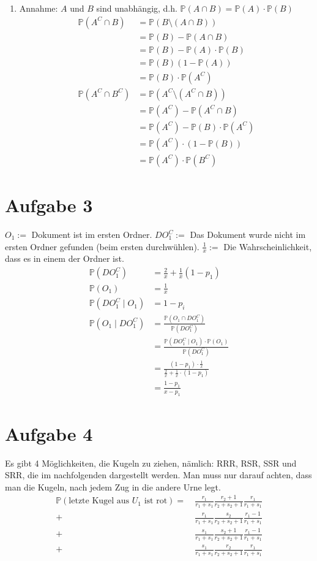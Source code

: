 \documentclass[10pt,a4paper,parskip=half]{scrartcl}
\newcommand{\PP}{\mathbb{P}}
\begin{document}
\begin{enumerate}
\begin{itemize}
		\end{itemize}
		\item 
		Annahme: $A$ und $B$ sind unabhängig, d.h. $\PP(A \cap B) = \PP(A) \cdot \PP(B)$
		\begin{align*}
			\PP(A^C \cap B) &= \PP(B \setminus (A \cap B)) \\
			&= \PP(B) - \PP(A \cap B) \\
			&= \PP(B) - \PP(A) \cdot \PP(B) \\
			&= \PP(B)(1 - \PP(A)) \\
			&= \PP(B)\cdot\PP(A^C) \\
			\PP(A^C \cap B^C) &= \PP(A^C \setminus (A^C \cap B)) \\
			&= \PP(A^C) - \PP(A^C \cap B) \\
			&= \PP(A^C) - \PP(B)\cdot\PP(A^C)  \\
			&= \PP(A^C)\cdot(1 - \PP(B)) \\
			&= \PP(A^C)\cdot\PP(B^C)
		\end{align*}
\end{enumerate}
\section*{Aufgabe 3}
$O_1 := $ Dokument ist im ersten Ordner.
$DO_1^C :=$ Das Dokument wurde nicht im ersten Ordner gefunden (beim ersten durchwühlen).
$\frac{1}{x} :=$ Die Wahrscheinlichkeit, dass es in einem der Ordner ist.
\begin{align*}
	\PP(DO_1^C) &= \frac{2}{x} + \frac{1}{x}(1 - p_1) \\
	\PP(O_1) &= \frac{1}{x} \\
	\PP(DO_1^C \mid O_1) &= 1 - p_i \\
	\PP(O_1 \mid DO_1^C) &= \frac{\PP(O_1 \cap DO_1^C)}{\PP(DO_1^C)} \\	
	&= \frac{\PP(DO_1^C \mid O_1) \cdot \PP(O_1)}{\PP(DO_1^C)} \\
	&= \frac{(1-p_1) \cdot \frac{1}{x}}{\frac{2}{x} + \frac{1}{x} \cdot (1-p_1)} \\
	&= \frac{1 - p_1}{x - p_1}
\end{align*}
\section*{Aufgabe 4}
Es gibt 4 Möglichkeiten, die Kugeln zu ziehen, nämlich: RRR, RSR, SSR und SRR, die im nachfolgenden dargestellt werden. Man muss nur darauf achten, dass man die Kugeln, nach jedem Zug in die andere Urne legt.
\begin{align*} 
\mathbb P(\text{letzte Kugel aus $U_1$ ist rot}) =&~ \frac{r_1}{r_1+s_1}\frac{r_2 + 1}{r_2+s_2 + 1}\frac{r_1}{r_1+s_1}\\
+&~ \frac{r_1}{r_1+s_1}\frac{s_2}{r_2+s_2 + 1}\frac{r_1-1}{r_1+s_1}\\
+&~ \frac{s_1}{r_1+s_1}\frac{s_2+1}{r_2+s_2 + 1}\frac{r_1-1}{r_1+s_1}\\
+&~ \frac{s_1}{r_1+s_1}\frac{r_2}{r_2+s_2 + 1}\frac{r_1}{r_1+s_1}
\end{align*}
\end{document}
